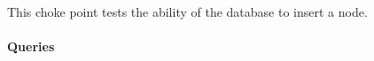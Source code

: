 
This choke point tests the ability of the database to insert a node.


\paragraph{Queries}
{\raggedright

}
